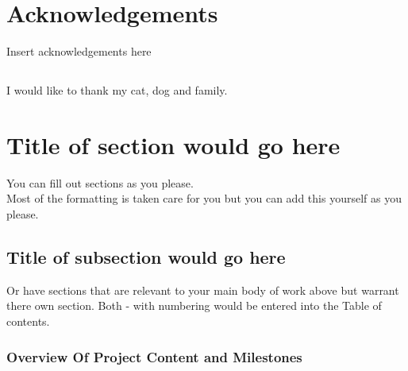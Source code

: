 \documentclass[12pt,a4paper]{article}
\begin{document}


\pagebreak

\pagebreak

\begin{abstract}
\end{abstract}
\pagebreak

\tableofcontents %
\newpage

\listoftables
\newpage

\listoffigures
\newpage

\section*{Acknowledgements}
Insert acknowledgements here
\subsection*{}
	I would like to thank my cat, dog and family.
\newpage


\section{Title of section would go here}
You can fill out sections as you please. \\ %

Most of the formatting is taken care for you but you can add this yourself as you please.

\subsection{Title of subsection would go here}
Or have sections that are relevant to your main body of work above but warrant there own section. Both - with numbering would be entered into the Table of contents.


 \subsubsection{Overview Of Project Content and Milestones}
\end{document}
